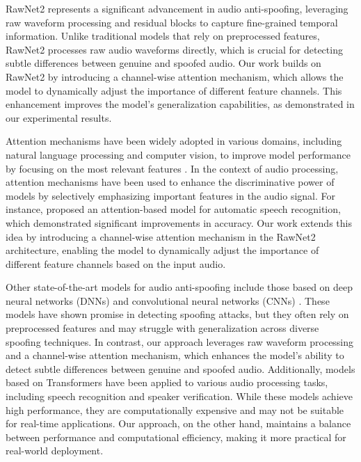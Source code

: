 \documentclass{article} %
\begin{document}
RawNet2 \citep{he2016deep} represents a significant advancement in audio anti-spoofing, leveraging raw waveform processing and residual blocks to capture fine-grained temporal information. Unlike traditional models that rely on preprocessed features, RawNet2 processes raw audio waveforms directly, which is crucial for detecting subtle differences between genuine and spoofed audio. Our work builds on RawNet2 by introducing a channel-wise attention mechanism, which allows the model to dynamically adjust the importance of different feature channels. This enhancement improves the model's generalization capabilities, as demonstrated in our experimental results.

Attention mechanisms have been widely adopted in various domains, including natural language processing and computer vision, to improve model performance by focusing on the most relevant features \citep{vaswani2017attention}. In the context of audio processing, attention mechanisms have been used to enhance the discriminative power of models by selectively emphasizing important features in the audio signal. For instance, \citep{lu2024aiscientist} proposed an attention-based model for automatic speech recognition, which demonstrated significant improvements in accuracy. Our work extends this idea by introducing a channel-wise attention mechanism in the RawNet2 architecture, enabling the model to dynamically adjust the importance of different feature channels based on the input audio.

Other state-of-the-art models for audio anti-spoofing include those based on deep neural networks (DNNs) and convolutional neural networks (CNNs) \citep{simonyan2014very}. These models have shown promise in detecting spoofing attacks, but they often rely on preprocessed features and may struggle with generalization across diverse spoofing techniques. In contrast, our approach leverages raw waveform processing and a channel-wise attention mechanism, which enhances the model's ability to detect subtle differences between genuine and spoofed audio. Additionally, models based on Transformers \citep{vaswani2017attention} have been applied to various audio processing tasks, including speech recognition and speaker verification. While these models achieve high performance, they are computationally expensive and may not be suitable for real-time applications. Our approach, on the other hand, maintains a balance between performance and computational efficiency, making it more practical for real-world deployment.
\end{document}
